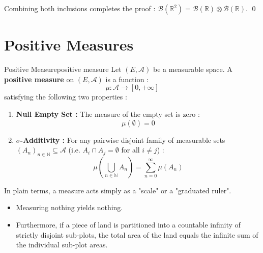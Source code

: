 Combining both inclusions completes the proof : $\mathcal{B}(\mathbb{R}^2) = \mathcal{B}(\mathbb{R}) \otimes \mathcal{B}(\mathbb{R})$. \qed

\newpage
\section{Positive Measures}

\vspace{1em}

\begin{definition}{Positive Measure}{positive measure}
Let $(E, \mathcal{A})$ be a measurable space. A \textbf{positive measure} on $(E, \mathcal{A})$ is a function :
\[
    \mu : \mathcal{A} \to [0, +\infty]
\]
satisfying the following two properties :
\begin{enumerate}[label=(\roman*)]
    \item \textbf{Null Empty Set :} The measure of the empty set is zero :
    \[
        \mu(\emptyset) = 0
    \]
    \item \textbf{$\sigma$-Additivity :} For any pairwise disjoint family of measurable sets $(A_n)_{n \in \mathbb{N}} \subseteq \mathcal{A}$ (i.e. $A_i \cap A_j = \emptyset$ for all $i \neq j$) :
    \[
        \mu\left( \bigcup_{n \in \mathbb{N}} A_n \right) = \sum_{n=0}^\infty \mu(A_n)
    \]
\end{enumerate}
\end{definition}

\begin{insight}
In plain terms, a measure acts simply as a "scale" or a "graduated ruler". 
\begin{itemize}
    \item Measuring nothing yields nothing.
    \item Furthermore, if a piece of land is partitioned into a countable infinity of strictly disjoint sub-plots, the total area of the land equals the infinite sum of the individual sub-plot areas.
\end{itemize}
\end{insight}


